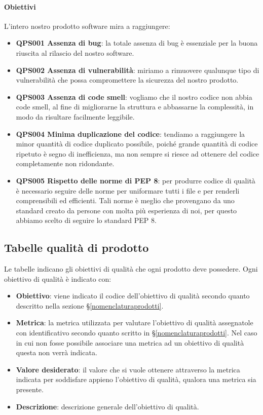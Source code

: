 		\paragraph*{Obiettivi} 	
		L'intero nostro prodotto software mira a raggiungere:
		\begin{itemize}
			\item \textbf{QPS001 Assenza di bug}: la totale assenza di bug è essenziale per la buona riuscita al rilascio del nostro software.
			\item \textbf{QPS002 Assenza di vulnerabilità}: miriamo a rimuovere qualunque tipo di vulnerabilità che possa compromettere la sicurezza del nostro prodotto.
			\item \textbf{QPS003 Assenza di code smell}: vogliamo che il nostro codice non abbia code smell, al fine di migliorarne la struttura e abbassarne la complessità, in modo da risultare facilmente leggibile.
			\item \textbf{QPS004 Minima duplicazione del codice}: tendiamo a raggiungere la minor quantità di codice duplicato possibile, poiché grande quantità di codice ripetuto è segno di inefficienza, ma non sempre si riesce ad ottenere del codice completamente non ridondante.
            \item \textbf{QPS005 Rispetto delle norme di PEP 8}: per produrre codice di qualità è necessario seguire delle norme per uniformare tutti i file e per renderli comprensibili ed efficienti. Tali norme è meglio che provengano da uno standard creato da persone con molta più esperienza di noi, per questo abbiamo scelto di seguire lo standard PEP 8. 
		\end{itemize}


\subsection{Tabelle qualità di prodotto} \label{tabellequalitaprodotto}
Le tabelle indicano gli obiettivi di qualità che ogni prodotto deve possedere.
Ogni obiettivo di qualità è indicato con:

\begin{itemize}
	\item \textbf{Obiettivo}: viene indicato il codice dell'obiettivo di qualità secondo quanto descritto nella sezione \S\ref{nomenclaturaprodotti}.
	\item \textbf{Metrica}: la metrica utilizzata per valutare l'obiettivo di qualità assegnatole con identificativo secondo quanto scritto in \S\ref{nomenclaturaprodotti}. Nel caso in cui non fosse possibile associare una metrica ad un obiettivo di qualità questa non verrà indicata.
	\item \textbf{Valore desiderato}: il valore che si vuole ottenere attraverso la metrica indicata per soddisfare appieno l'obiettivo di qualità, qualora una metrica sia presente.
	\item \textbf{Descrizione}: descrizione generale dell'obiettivo di qualità.
\end{itemize}

